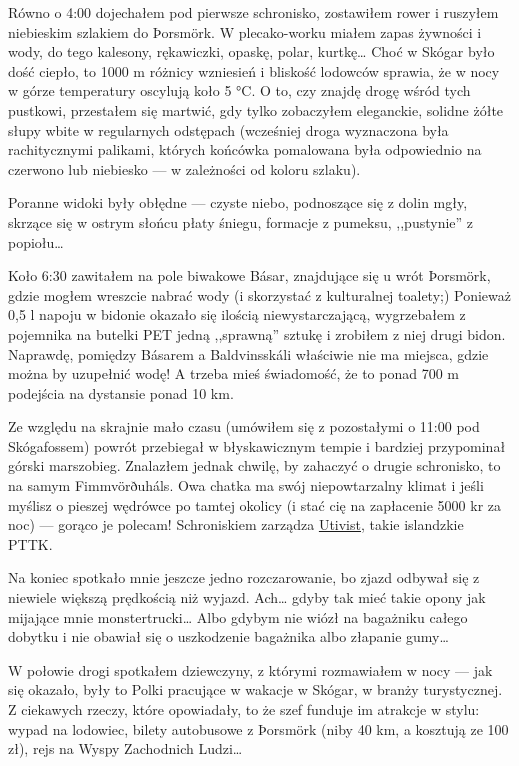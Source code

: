 Równo o 4:00 dojechałem pod pierwsze schronisko, zostawiłem rower i ruszyłem niebieskim szlakiem do Þorsmörk. W plecako-worku miałem zapas żywności i wody, do tego kalesony, rękawiczki, opaskę, polar, kurtkę… Choć w Skógar było dość ciepło, to 1000 m różnicy wzniesień i bliskość lodowców sprawia, że w nocy w górze temperatury oscylują koło 5 °C. O to, czy znajdę drogę wśród tych pustkowi, przestałem się martwić, gdy tylko zobaczyłem eleganckie, solidne żółte słupy wbite w regularnych odstępach (wcześniej droga wyznaczona była rachitycznymi palikami, których końcówka pomalowana była odpowiednio na czerwono lub niebiesko --- w zależności od koloru szlaku).

Poranne widoki były obłędne --- czyste niebo, podnoszące się z dolin mgły, skrzące się w ostrym słońcu płaty śniegu, formacje z pumeksu, ,,pustynie'' z popiołu…


Koło 6:30 zawitałem na pole biwakowe Básar,  znajdujące się u wrót Þorsmörk, gdzie mogłem wreszcie nabrać wody (i skorzystać z kulturalnej toalety;) Ponieważ 0,5 l napoju w bidonie okazało się ilością niewystarczającą, wygrzebałem z pojemnika na butelki PET jedną ,,sprawną'' sztukę i zrobiłem z niej drugi bidon. Naprawdę, pomiędzy Básarem a Baldvinsskáli właściwie nie ma miejsca, gdzie można by uzupełnić wodę! A trzeba mieś świadomość, że to ponad 700 m podejścia na dystansie ponad 10 km.

Ze względu na skrajnie mało czasu (umówiłem się z pozostałymi o 11:00 pod Skógafossem) powrót przebiegał w błyskawicznym tempie i bardziej przypominał górski marszobieg. Znalazłem jednak chwilę, by zahaczyć o drugie schronisko, to na samym Fimmvörðuháls. Owa chatka ma swój niepowtarzalny klimat i jeśli myślisz o pieszej wędrówce po tamtej okolicy (i stać cię na zapłacenie 5000 kr za noc) --- gorąco je polecam! Schroniskiem zarządza \href{http://www.utivist.is/english}{Utivist}, takie islandzkie PTTK.

Na koniec spotkało mnie jeszcze jedno rozczarowanie, bo zjazd odbywał się z niewiele większą prędkością niż wyjazd. Ach… gdyby tak mieć takie opony jak mijające mnie monstertrucki… Albo gdybym nie wiózł na bagażniku całego dobytku i nie obawiał się o uszkodzenie bagażnika albo złapanie gumy…

W połowie drogi spotkałem dziewczyny, z którymi rozmawiałem w nocy --- jak się okazało, były to Polki pracujące w wakacje w Skógar, w branży turystycznej. Z ciekawych rzeczy, które opowiadały, to że szef funduje im atrakcje w stylu: wypad na lodowiec, bilety autobusowe z Þorsmörk (niby 40 km, a kosztują ze 100 zł), rejs na Wyspy Zachodnich Ludzi…

